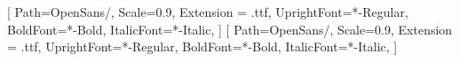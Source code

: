 \setsansfont{OpenSans}[
    Path=OpenSans/,
    Scale=0.9,
    Extension = .ttf,
    UprightFont=*-Regular,
    BoldFont=*-Bold,
    ItalicFont=*-Italic,
    ]
\setmainfont{OpenSans}[
    Path=OpenSans/,
    Scale=0.9,
    Extension = .ttf,
    UprightFont=*-Regular,
    BoldFont=*-Bold,
    ItalicFont=*-Italic,
    ]
    
\usepackage{etoolbox}

\usepackage[none]{hyphenat}
